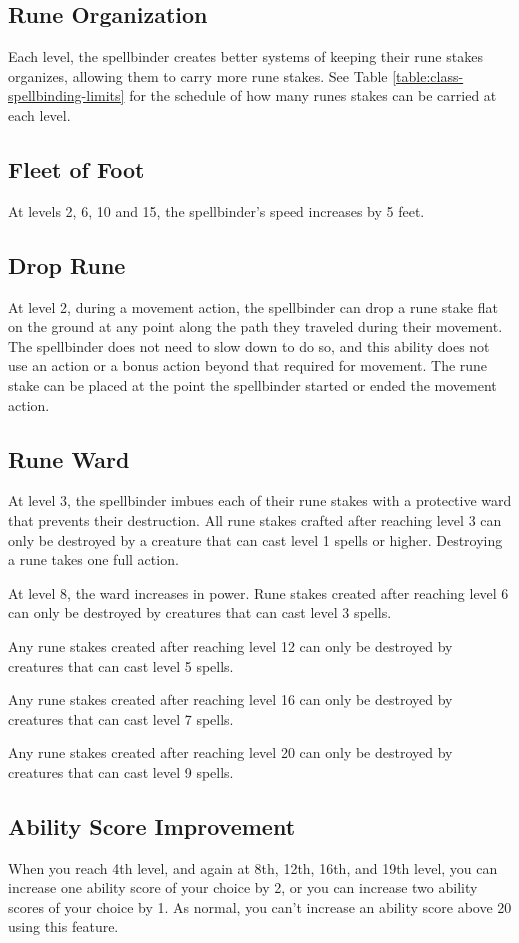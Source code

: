\subsection{Rune Organization}
Each level, the spellbinder creates better systems of keeping their rune stakes organizes, allowing them to carry more rune stakes. See Table \ref{table:class-spellbinding-limits} for the schedule of how many runes stakes can be carried at each level.

\subsection{Fleet of Foot}
At levels 2, 6, 10 and 15, the spellbinder's speed increases by 5 feet.

\subsection{Drop Rune}
At level 2, during a movement action, the spellbinder can drop a rune stake flat on the ground at any point along the path they traveled during their movement. The spellbinder does not need to slow down to do so, and this ability does not use an action or a bonus action beyond that required for movement. The rune stake can be placed at the point the spellbinder started or ended the movement action.

\subsection{Rune Ward}
At level 3, the spellbinder imbues each of their rune stakes with a protective ward that prevents their destruction. All rune stakes crafted after reaching level 3 can only be destroyed by a creature that can cast level 1 spells or higher. Destroying a rune takes one full action.

At level 8, the ward increases in power. Rune stakes created after reaching level 6 can only be destroyed by creatures that can cast level 3 spells.

Any rune stakes created after reaching level 12 can only be destroyed by creatures that can cast level 5 spells.

Any rune stakes created after reaching level 16 can only be destroyed by creatures that can cast level 7 spells.

Any rune stakes created after reaching level 20 can only be destroyed by creatures that can cast level 9 spells.

\subsection{Ability Score Improvement}
When you reach 4th level, and again at 8th, 12th, 16th, and 19th level, you can increase one ability score of your choice by 2, or you can increase two ability scores of your choice by 1. As normal, you can't increase an ability score above 20 using this feature.

